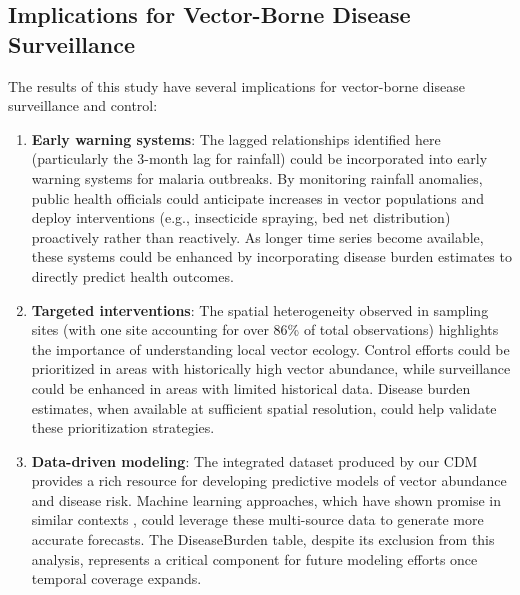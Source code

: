 \documentclass{article}
\begin{document}
\subsection{Implications for Vector-Borne Disease Surveillance}

The results of this study have several implications for vector-borne disease surveillance and control:

\begin{enumerate}
    \item \textbf{Early warning systems}: The lagged relationships identified here (particularly the 3-month lag for 
    rainfall) could be incorporated into early warning systems for malaria outbreaks. By monitoring rainfall anomalies, 
    public health officials could anticipate increases in vector populations and deploy interventions (e.g., insecticide 
    spraying, bed net distribution) proactively rather than reactively. As longer time series become available, these 
    systems could be enhanced by incorporating disease burden estimates to directly predict health outcomes.

    \item \textbf{Targeted interventions}: The spatial heterogeneity observed in sampling sites (with one site accounting 
    for over 86\% of total observations) highlights the importance of understanding local vector ecology. Control efforts 
    could be prioritized in areas with historically high vector abundance, while surveillance could be enhanced in areas 
    with limited historical data. Disease burden estimates, when available at sufficient spatial resolution, could help 
    validate these prioritization strategies.

    \item \textbf{Data-driven modeling}: The integrated dataset produced by our CDM provides a rich resource for developing 
    predictive models of vector abundance and disease risk. Machine learning approaches, which have shown promise in similar 
    contexts \citep{2024.MH.AVD, 2024.OK.PMO}, could leverage these multi-source data to generate more accurate forecasts. 
    The DiseaseBurden table, despite its exclusion from this analysis, represents a critical component for future modeling 
    efforts once temporal coverage expands.
\end{enumerate}
\end{document}
